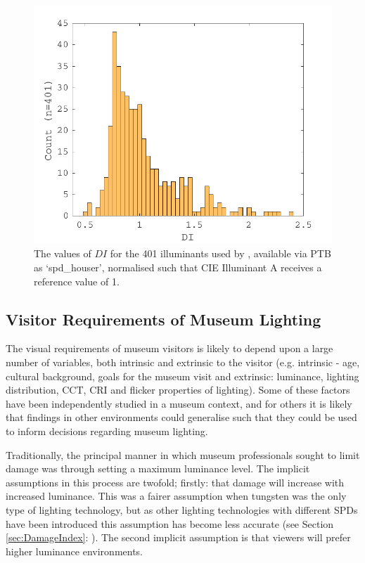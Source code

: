 \begin{figure}[htbp]
\includegraphics[max width=\textwidth]{figs/LitRev/DI.pdf}
\caption{The values of $DI$ for the 401 illuminants used by \citet{houser_review_2013}, available via \gls{PTB} as `spd\_houser', normalised such that \gls{CIE} Illuminant A receives a reference value of 1.}
\label{fig:Houser}
\end{figure}


\clearpage
\subsection{Visitor Requirements of Museum Lighting}

The visual requirements of museum visitors is likely to depend upon a large number of variables, both intrinsic and extrinsic to the visitor (e.g. intrinsic - age, cultural background, goals for the museum visit and extrinsic: luminance, lighting distribution, \gls{CCT}, \gls{CRI} and flicker properties of lighting). Some of these factors have been independently studied in a museum context, and for others it is likely that findings in other environments could generalise such that they could be used to inform decisions regarding museum lighting.

Traditionally, the principal manner in which museum professionals sought to limit damage was through setting a maximum luminance level. The implicit assumptions in this process are twofold; firstly: that damage will increase with increased luminance. This was a fairer assumption when tungsten was the only type of lighting technology, but as other lighting technologies with different \glspl{SPD} have been introduced this assumption has become less accurate (see Section \ref{sec:DamageIndex}: ). The second implicit assumption is that viewers will prefer higher luminance environments.

